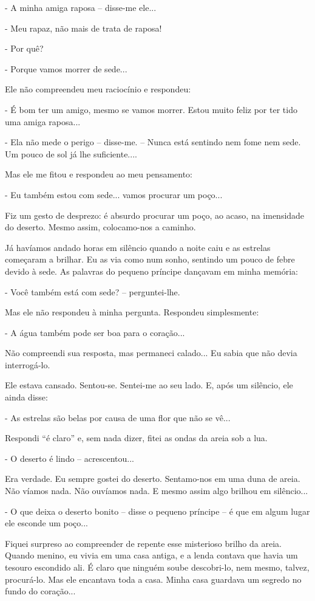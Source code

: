 - A minha amiga raposa -- disse-me ele...

- Meu rapaz, não mais de trata de raposa!

- Por quê?

- Porque vamos morrer de sede...

Ele não compreendeu meu raciocínio e respondeu:

- É bom ter um amigo, mesmo se vamos morrer. Estou muito feliz por ter
tido uma amiga raposa...

- Ela não mede o perigo -- disse-me. -- Nunca está sentindo nem fome nem
sede. Um pouco de sol já lhe suficiente....

Mas ele me fitou e respondeu ao meu pensamento:

- Eu também estou com sede... vamos procurar um poço...

Fiz um gesto de desprezo: é absurdo procurar um poço, ao acaso, na
imensidade do deserto. Mesmo assim, colocamo-nos a caminho.

Já havíamos andado horas em silêncio quando a noite caiu e as estrelas
começaram a brilhar. Eu as via como num sonho, sentindo um pouco de
febre devido à sede. As palavras do pequeno príncipe dançavam em minha
memória:

- Você também está com sede? -- perguntei-lhe.

Mas ele não respondeu à minha pergunta. Respondeu simplesmente:

- A água também pode ser boa para o coração...

Não compreendi sua resposta, mas permaneci calado... Eu sabia que não
devia interrogá-lo.

Ele estava cansado. Sentou-se. Sentei-me ao seu lado. E, após um
silêncio, ele ainda disse:

- As estrelas são belas por causa de uma flor que não se vê...

Respondi ``é claro'' e, sem nada dizer, fitei as ondas da areia sob a
lua.

- O deserto é lindo -- acrescentou...

Era verdade. Eu sempre gostei do deserto. Sentamo-nos em uma duna de
areia. Não víamos nada. Não ouvíamos nada. E mesmo assim algo brilhou em
silêncio...

- O que deixa o deserto bonito -- disse o pequeno príncipe -- é que em
algum lugar ele esconde um poço...

Fiquei surpreso ao compreender de repente esse misterioso brilho da
areia. Quando menino, eu vivia em uma casa antiga, e a lenda contava que
havia um tesouro escondido ali. É claro que ninguém soube descobri-lo,
nem mesmo, talvez, procurá-lo. Mas ele encantava toda a casa. Minha casa
guardava um segredo no fundo do coração...

